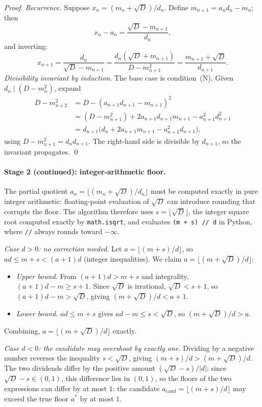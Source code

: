\begin{proof}
  \emph{Recurrence.}  Suppose $x_n = (m_n + \sqrt{D})/d_n$.  Define
  $m_{n+1} = a_n d_n - m_n$; then
  \[
    x_n - a_n = \frac{\sqrt{D} - m_{n+1}}{d_n},
  \]
  and inverting:
  \[
    x_{n+1}
    = \frac{d_n}{\sqrt{D} - m_{n+1}}
    = \frac{d_n(\sqrt{D} + m_{n+1})}{D - m_{n+1}^2}
    = \frac{m_{n+1} + \sqrt{D}}{d_{n+1}}.
  \]
  \emph{Divisibility invariant by induction.}
  The base case is condition~(N).  Given $d_n \mid (D - m_n^2)$, expand
  \begin{align*}
    D - m_{n+2}^2
    &= D - (a_{n+1}d_{n+1} - m_{n+1})^2 \\
    &= (D - m_{n+1}^2) + 2a_{n+1}d_{n+1}m_{n+1} - a_{n+1}^2 d_{n+1}^2 \\
    &= d_{n+1}\bigl(d_n + 2a_{n+1}m_{n+1} - a_{n+1}^2 d_{n+1}\bigr),
  \end{align*}
  using $D - m_{n+1}^2 = d_n d_{n+1}$.  The right-hand side is divisible by
  $d_{n+1}$, so the invariant propagates. \qed
\end{proof}

\paragraph{Stage 2 (continued): integer-arithmetic floor.}
The partial quotient $a_n = \lfloor(m_n + \sqrt{D})/d_n\rfloor$ must be computed
exactly in pure integer arithmetic: floating-point evaluation of $\sqrt{D}$
can introduce rounding that corrupts the floor.  The algorithm therefore uses
$s = \lfloor\sqrt{D}\rfloor$, the integer square root computed exactly by
\texttt{math.isqrt}, and evaluates \texttt{(m + s) // d} in Python, where
\texttt{//} always rounds toward $-\infty$.

\emph{Case $d > 0$: no correction needed.}
Let $a = \lfloor(m+s)/d\rfloor$, so $ad \leq m + s < (a+1)d$ (integer
inequalities).  We claim $a = \lfloor(m + \sqrt{D})/d\rfloor$:
\begin{itemize}
  \item \emph{Upper bound.} From $(a+1)d > m+s$ and integrality,
        $(a+1)d - m \geq s+1$.  Since $\sqrt{D}$ is irrational,
        $\sqrt{D} < s+1$, so $(a+1)d - m > \sqrt{D}$, giving
        $(m + \sqrt{D})/d < a+1$.
  \item \emph{Lower bound.} $ad \leq m+s$ gives $ad - m \leq s < \sqrt{D}$,
        so $(m + \sqrt{D})/d > a$.
\end{itemize}
Combining, $a = \lfloor(m + \sqrt{D})/d\rfloor$ exactly.

\emph{Case $d < 0$: the candidate may overshoot by exactly one.}
Dividing by a negative number reverses the inequality $s < \sqrt{D}$,
giving $(m+s)/d > (m+\sqrt{D})/d$.  The two dividends differ by the positive
amount $(\sqrt{D} - s)/|d|$; since $\sqrt{D} - s \in (0,1)$, this difference
lies in $(0,1)$, so the floors of the two expressions can differ by at most
$1$: the candidate $a_{\mathrm{cand}} = \lfloor(m+s)/d\rfloor$ may exceed the
true floor $a^*$ by at most $1$.

